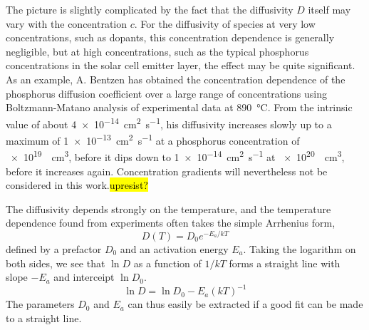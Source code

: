 \documentclass[11pt,bibliography=totoc,index=totoc]{scrbook}   %
\newcommand{\comment}[1]{\hl{#1}}
\begin{document}
The picture is slightly complicated by the fact that the diffusivity $D$ itself may vary with the concentration $c$.
For the diffusivity of species at very low concentrations, such as dopants, this concentration dependence is generally negligible, but at high concentrations, such as the typical phosphorus concentrations in the solar cell emitter layer, the effect may be quite significant.
As an example, A. Bentzen has obtained the concentration dependence of the phosphorus diffusion coefficient over a large range of concentrations using Boltzmann-Matano analysis of experimental data at \SI{890}{\celsius}. 
From the intrinsic value of about \SI{4e-14}{\centi\metre\squared\per\second}, his diffusivity increases slowly up to a maximum of \SI{1e-13}{\centi\metre\squared\per\second} at a phosphorus concentration of \SI{e19}{\per\centi\metre\cubed}, before it dips down to \SI{1e-14}{\centi\metre\squared\per\second} at \SI{e20}{\per\centi\metre\cubed}, before it increases again.\cite{Bentzen:2006} Concentration gradients will nevertheless not be considered in this work.\comment{upresist?}

The diffusivity depends strongly on the temperature, and the temperature dependence found from experiments often takes the simple Arrhenius form,
\begin{equation}
  D(T) = D_0 e^{-E_a/kT}
\end{equation}
defined by a prefactor $D_0$ and an activation energy $E_a$. 
Taking the logarithm on both sides, we see that $\ln D$ as a function of $1/kT$ forms a straight line with slope $-E_a$ and interceipt $\ln D_0$. 
\begin{equation}
  \ln D = \ln D_0 - E_a (kT)^{-1}
\end{equation}
The parameters $D_0$ and $E_a$ can thus easily be extracted if a good fit can be made to a straight line.


\end{document}
